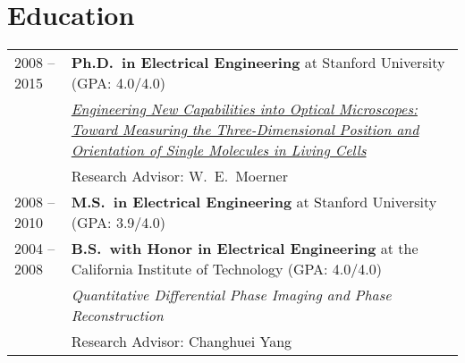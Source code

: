 \documentclass[letter,11pt]{article}
\begin{document}


\section{Education}
\begin{tabularx}{\linewidth}{@{}l X@{}}	
2008 -- 2015 & \textbf{Ph.D.\ in Electrical Engineering} at Stanford University \hfill \normalsize (GPA: 4.0/4.0) \\
    & \href{https://searchworks.stanford.edu/view/10636571}{\textit{Engineering New Capabilities into Optical Microscopes: Toward Measuring the Three-Dimensional Position and Orientation of Single Molecules in Living Cells}} \\
    & Research Advisor: W.\ E.\ Moerner \\

2008 -- 2010 & \textbf{M.S.\ in Electrical Engineering} at Stanford University \hfill \normalsize (GPA: 3.9/4.0) \\

2004 -- 2008 & \textbf{B.S.\ with Honor in Electrical Engineering} at the California Institute of Technology \hfill \normalsize (GPA: 4.0/4.0) \\
    & \textit{Quantitative Differential Phase Imaging and Phase Reconstruction} \\
    & Research Advisor: Changhuei Yang \\
\end{tabularx}
\end{document}
